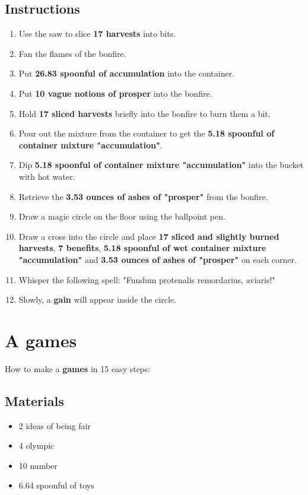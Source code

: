 \documentclass{article}
\begin{document}
\subsection{Instructions}\begin{enumerate}
\item 
Use the saw to slice \textbf{17 harvests} into bits.
\item 
Fan the flames of the bonfire.
\item 
Put \textbf{26.83 spoonful of accumulation} into the container.
\item 
Put \textbf{10 vague notions of prosper} into the bonfire.
\item 
Hold \textbf{17 sliced harvests} briefly into the bonfire to burn them a bit.
\item 
Pour out the mixture from the container to get the \textbf{5.18 spoonful of container mixture "accumulation"}.
\item 
Dip \textbf{5.18 spoonful of container mixture "accumulation"} into the bucket with hot water.
\item 
Retrieve the \textbf{3.53 ounces of ashes of "prosper"} from the bonfire.
\item 
Draw a magic circle on the floor using the ballpoint pen.
\item 
Draw a cross into the circle and place \textbf{17 sliced and slightly burned harvests}, \textbf{7 benefits}, \textbf{5.18 spoonful of wet container mixture "accumulation"} and \textbf{3.53 ounces of ashes of "prosper"} on each corner.
\item 
Whisper the following spell: "Fundum protenalis remordarius, aviaris!"
\item 
Slowly, a \textbf{gain} will appear inside the circle.
\end{enumerate}
\newpage
\section{A games}How to make a \textbf{games} in 15 easy steps:

\subsection{Materials}\begin{itemize}
\item 
2 ideas of being fair
\item 
4 olympic
\item 
10 number
\item 
6.64 spoonful of toys
\end{itemize}
\end{document}
